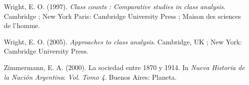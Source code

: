 \documentclass[
]{article}
\newlength{\cslhangindent}
\newlength{\cslentryspacingunit} %
\newenvironment{CSLReferences}[2] %
 {%
  \setlength{\parindent}{0pt}
  \ifodd #1
  \let\oldpar\par
  \def\par{\hangindent=\cslhangindent\oldpar}
  \fi
  \setlength{\parskip}{#2\cslentryspacingunit}
 }%
 {}
\begin{document}
\begin{CSLReferences}{1}{0}
\leavevmode{}%
Wright, E. O. (1997). \emph{Class counts : Comparative studies in class analysis}. Cambridge ; New York Paris: Cambridge University Press ; Maison des sciences de l'homme.

\leavevmode{}%
Wright, E. O. (2005). \emph{Approaches to class analysis}. Cambridge, UK ; New York: Cambridge University Press.

\leavevmode{}%
Zimmermann, E. A. (2000). La sociedad entre 1870 y 1914. In \emph{Nueva {Historia} de la {Nación} {Argentina}}: \emph{Vol.} \emph{Tomo 4}. Buenos Aires: Planeta.

\end{CSLReferences}
\end{document}
